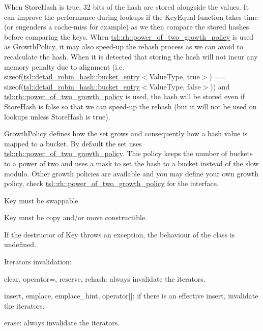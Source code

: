When {\ttfamily Store\+Hash} is true, 32 bits of the hash are stored alongside the values. It can improve the performance during lookups if the {\ttfamily Key\+Equal} function takes time (or engenders a cache-\/miss for example) as we then compare the stored hashes before comparing the keys. When {\ttfamily \mbox{\hyperlink{classtsl_1_1rh_1_1power__of__two__growth__policy}{tsl\+::rh\+::power\+\_\+of\+\_\+two\+\_\+growth\+\_\+policy}}} is used as {\ttfamily Growth\+Policy}, it may also speed-\/up the rehash process as we can avoid to recalculate the hash. When it is detected that storing the hash will not incur any memory penalty due to alignment (i.\+e. {\ttfamily sizeof(\mbox{\hyperlink{classtsl_1_1detail__robin__hash_1_1bucket__entry}{tsl\+::detail\+\_\+robin\+\_\+hash\+::bucket\+\_\+entry}}$<$Value\+Type, true$>$) == sizeof(\mbox{\hyperlink{classtsl_1_1detail__robin__hash_1_1bucket__entry}{tsl\+::detail\+\_\+robin\+\_\+hash\+::bucket\+\_\+entry}}$<$Value\+Type, false$>$)}) and {\ttfamily \mbox{\hyperlink{classtsl_1_1rh_1_1power__of__two__growth__policy}{tsl\+::rh\+::power\+\_\+of\+\_\+two\+\_\+growth\+\_\+policy}}} is used, the hash will be stored even if {\ttfamily Store\+Hash} is false so that we can speed-\/up the rehash (but it will not be used on lookups unless {\ttfamily Store\+Hash} is true).

{\ttfamily Growth\+Policy} defines how the set grows and consequently how a hash value is mapped to a bucket. By default the set uses {\ttfamily \mbox{\hyperlink{classtsl_1_1rh_1_1power__of__two__growth__policy}{tsl\+::rh\+::power\+\_\+of\+\_\+two\+\_\+growth\+\_\+policy}}}. This policy keeps the number of buckets to a power of two and uses a mask to set the hash to a bucket instead of the slow modulo. Other growth policies are available and you may define your own growth policy, check {\ttfamily \mbox{\hyperlink{classtsl_1_1rh_1_1power__of__two__growth__policy}{tsl\+::rh\+::power\+\_\+of\+\_\+two\+\_\+growth\+\_\+policy}}} for the interface.

{\ttfamily Key} must be swappable.

{\ttfamily Key} must be copy and/or move constructible.

If the destructor of {\ttfamily Key} throws an exception, the behaviour of the class is undefined.

Iterators invalidation\+:
\begin{DoxyItemize}
\item clear, operator=, reserve, rehash\+: always invalidate the iterators.
\item insert, emplace, emplace\+\_\+hint, operator\mbox{[}\mbox{]}\+: if there is an effective insert, invalidate the iterators.
\item erase\+: always invalidate the iterators. 
\end{DoxyItemize}

